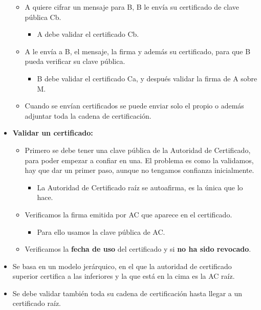 \documentclass[12pt, twoside, openright]{report} %
\begin{document}
\begin{itemize}
    \begin{itemize}
    \item A quiere cifrar un mensaje para B, B le envía su certificado de
      clave pública Cb.
      

      \begin{itemize}
      \item A debe validar el certificado Cb.
        
      \end{itemize}
    \item A le envía a B, el mensaje, la firma y además su certificado, para
      que B pueda verificar su clave pública.
      

      \begin{itemize}
      \item B debe validar el certificado Ca, y después validar la firma de
        A sobre M.
        
      \end{itemize}
    \item Cuando se envían certificados se puede enviar solo el propio o
      además adjuntar toda la cadena de certificación.
      
    \end{itemize}
  \item \textbf{Validar un certificado:}
    

    \begin{itemize}
    \item Primero se debe tener una clave pública de la Autoridad de
      Certificado, para poder empezar a confiar en una. El problema es
      como la validamos, hay que dar un primer paso, aunque no tengamos
      confianza inicialmente.
      

      \begin{itemize}
      \item La Autoridad de Certificado raíz se autoafirma, es la única que
        lo hace.
        
      \end{itemize}
    \item Verificamos la firma emitida por AC que aparece en el certificado.
      

      \begin{itemize}
      \item Para ello usamos la clave pública de AC.
        
      \end{itemize}
    \item Verificamos la \textbf{fecha de uso} del certificado y si
      \textbf{no ha sido revocado}.
      
    \end{itemize}
  \item Se basa en un modelo jerárquico, en el que la autoridad de
    certificado superior certifica a las inferiores y la que está en la
    cima es la AC raíz.
    
  \item Se debe validar también toda su cadena de certificación hasta llegar
    a un certificado raíz.
    
  \end{itemize}



\end{document}
